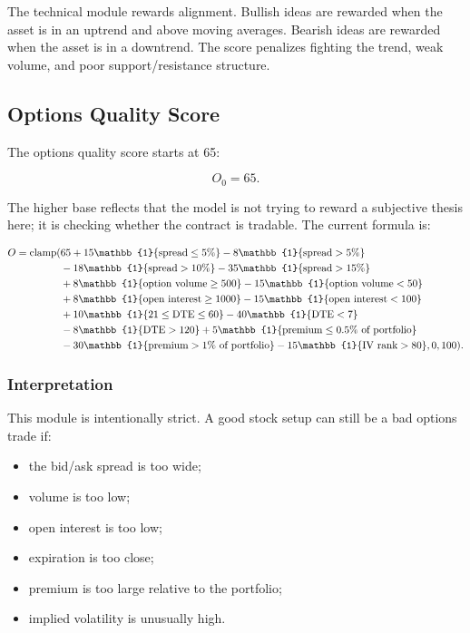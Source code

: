 \documentclass[11pt]{article}
\newcommand{\indicator}[1]{\mathbb{1}\{#1\}}
\newcommand{\clamp}{\operatorname{clamp}}
\begin{document}
The technical module rewards alignment. Bullish ideas are rewarded when the asset is in an uptrend and above moving averages. Bearish ideas are rewarded when the asset is in a downtrend. The score penalizes fighting the trend, weak volume, and poor support/resistance structure.

\subsection{Options Quality Score}

The options quality score starts at 65:

\begin{equation}
O_0 = 65.
\end{equation}

The higher base reflects that the model is not trying to reward a subjective thesis here; it is checking whether the contract is tradable. The current formula is:

\begin{align}
O = \clamp(&65
 + 15\indicator{\text{spread} \le 5\%}
 - 8\indicator{\text{spread} > 5\%} \notag \\
&- 18\indicator{\text{spread} > 10\%}
 - 35\indicator{\text{spread} > 15\%} \notag \\
&+ 8\indicator{\text{option volume} \ge 500}
 - 15\indicator{\text{option volume} < 50} \notag \\
&+ 8\indicator{\text{open interest} \ge 1000}
 - 15\indicator{\text{open interest} < 100} \notag \\
&+ 10\indicator{21 \le \text{DTE} \le 60}
 - 40\indicator{\text{DTE} < 7} \notag \\
&- 8\indicator{\text{DTE} > 120}
 + 5\indicator{\text{premium} \le 0.5\%\text{ of portfolio}} \notag \\
&- 30\indicator{\text{premium} > 1\%\text{ of portfolio}}
 - 15\indicator{\text{IV rank} > 80},
0,100).
\end{align}

\subsubsection{Interpretation}

This module is intentionally strict. A good stock setup can still be a bad options trade if:

\begin{itemize}[noitemsep]
  \item the bid/ask spread is too wide;
  \item volume is too low;
  \item open interest is too low;
  \item expiration is too close;
  \item premium is too large relative to the portfolio;
  \item implied volatility is unusually high.
\end{itemize}
\end{document}
